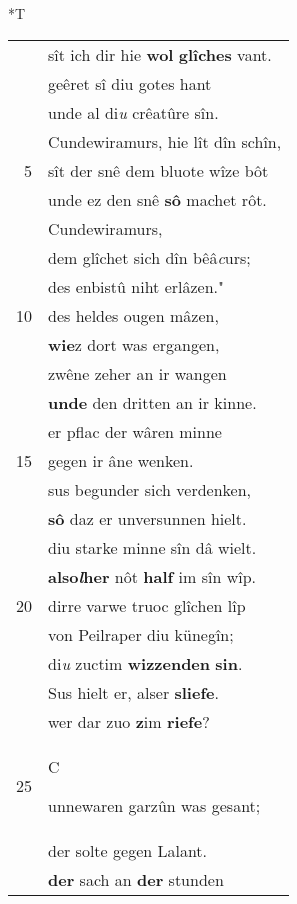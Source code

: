 \documentclass[8pt,a4paper,notitlepage]{article}
\begin{document}
\begin{table}[ht]
\begin{minipage}[t]{0.5\linewidth}
\end{minipage}
\hspace{0.5cm}
\begin{minipage}[t]{0.5\linewidth}
\small
\begin{center}*T
\end{center}
\begin{tabular}{rl}
 & sît ich dir hie \textbf{wol} \textbf{glîches} vant.\\ 
 & geêret sî diu gotes hant\\ 
 & unde al di\textit{u} crêatûre sîn.\\ 
 & Cundewiramurs, hie lît dîn schîn,\\ 
5 & sît der snê dem bluote wîze bôt\\ 
 & unde ez den snê \textbf{sô} machet rôt.\\ 
 & Cundewiramurs,\\ 
 & dem glîchet sich dîn bêâ\textit{c}urs;\\ 
 & des enbistû niht erlâzen."\\ 
10 & des heldes ougen mâzen,\\ 
 & \textbf{wie}z dort was ergangen,\\ 
 & zwêne zeher an ir wangen\\ 
 & \textbf{unde} den dritten an ir kinne.\\ 
 & er pflac der wâren minne\\ 
15 & gegen ir âne wenken.\\ 
 & sus begunder sich verdenken,\\ 
 & \textbf{sô} daz er unversunnen hielt.\\ 
 & diu starke minne sîn dâ wielt.\\ 
 & \textbf{al}\textbf{so\textit{l}her} nôt \textbf{half} im sîn wîp.\\ 
20 & dirre varwe truoc glîchen lîp\\ 
 & von Peilraper diu künegîn;\\ 
 & di\textit{u} zuctim \textbf{wizzenden} \textbf{sin}.\\ 
 & Sus hielt er, alser \textbf{sliefe}.\\ 
 & wer dar zuo \textbf{z}im \textbf{riefe}?\\ 
25 & \begin{large}C\end{large}unnewaren garzûn was gesant;\\ 
 & der solte gegen Lalant.\\ 
 & \textbf{der} sach an \textbf{der} stunden\\ 

\end{tabular}
\end{minipage}
\end{table}
\end{document}
